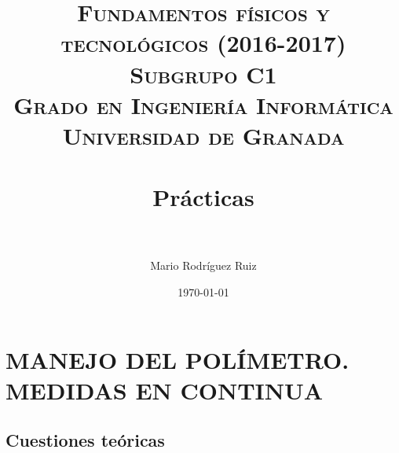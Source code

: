 


\title{	
\normalfont \normalsize 
\textsc{\textbf{Fundamentos físicos y tecnológicos (2016-2017)} \\ Subgrupo C1 \\ Grado en Ingeniería Informática\\ Universidad de Granada} \\ [25pt] %
\horrule{0.5pt} \\[0.4cm] %
\huge Prácticas \\ %
\horrule{2pt} \\[0.5cm] %
}

\author{Mario Rodríguez Ruiz} %

\date{\normalsize\today} %




\maketitle %

\newpage %

\tableofcontents %

\listoffigures

\listoftables

\newpage


\section{MANEJO DEL POLÍMETRO. MEDIDAS EN CONTINUA}

\subsection{Cuestiones teóricas}
